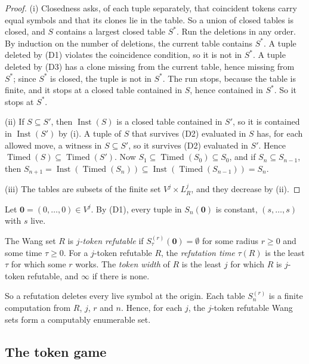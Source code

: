 \begin{proof}
(i) Closedness asks, of each tuple separately, that coincident tokens carry equal symbols and that its clones lie in the table. So a union of closed tables is closed, and $S$ contains a largest closed table $S^*$. Run the deletions in any order. By induction on the number of deletions, the current table contains $S^*$. A tuple deleted by (D1) violates the coincidence condition, so it is not in $S^*$. A tuple deleted by (D3) has a clone missing from the current table, hence missing from $S^*$; since $S^*$ is closed, the tuple is not in $S^*$. The run stops, because the table is finite, and it stops at a closed table contained in $S$, hence contained in $S^*$. So it stops at $S^*$.

(ii) If $S\subseteq S'$, then $\operatorname{Inst}(S)$ is a closed table contained in $S'$, so it is contained in $\operatorname{Inst}(S')$ by (i). A tuple of $S$ that survives (D2) evaluated in $S$ has, for each allowed move, a witness in $S\subseteq S'$, so it survives (D2) evaluated in $S'$. Hence $\operatorname{Timed}(S)\subseteq\operatorname{Timed}(S')$. Now $S_1\subseteq\operatorname{Timed}(S_0)\subseteq S_0$, and if $S_n\subseteq S_{n-1}$, then $S_{n+1}=\operatorname{Inst}(\operatorname{Timed}(S_n))\subseteq\operatorname{Inst}(\operatorname{Timed}(S_{n-1}))=S_n$.

(iii) The tables are subsets of the finite set $V^j\times L_R^j$, and they decrease by (ii).
\end{proof}

Let $\mathbf 0=(0,\dots,0)\in V^j$. By (D1), every tuple in $S_n(\mathbf 0)$ is constant, $(s,\dots,s)$ with $s$ live.

\begin{definition}[Refutability]\label{set:def-refutable}
The Wang set $R$ is \emph{$j$-token refutable} if $S^{(r)}_\tau(\mathbf 0)=\emptyset$ for some radius $r\ge0$ and some time $\tau\ge0$. For a $j$-token refutable $R$, the \emph{refutation time} $\tau(R)$ is the least $\tau$ for which some $r$ works. The \emph{token width} of $R$ is the least $j$ for which $R$ is $j$-token refutable, and $\infty$ if there is none.
\end{definition}

So a refutation deletes every live symbol at the origin. Each table $S^{(r)}_n$ is a finite computation from $R$, $j$, $r$ and $n$. Hence, for each $j$, the $j$-token refutable Wang sets form a computably enumerable set.

\subsection{The token game}\label{set:sub-game}

